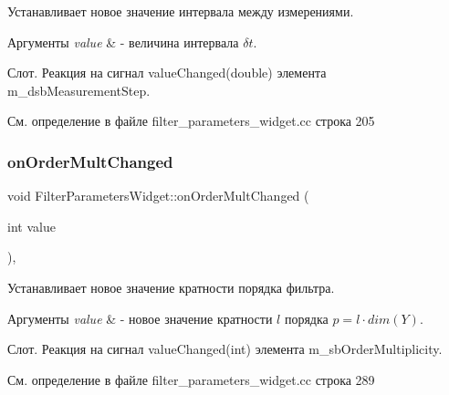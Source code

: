 Устанавливает новое значение интервала между измерениями. 


\begin{DoxyParams}{Аргументы}
{\em value} & -\/ величина интервала $\delta t$.\\
\hline
\end{DoxyParams}
Слот. Реакция на сигнал value\+Changed(double) элемента m\+\_\+dsb\+Measurement\+Step. 

См. определение в файле filter\+\_\+parameters\+\_\+widget.\+cc строка 205

\hypertarget{class_filter_parameters_widget_adacd531098565f7b21bd8d958a35fa74}{}\label{class_filter_parameters_widget_adacd531098565f7b21bd8d958a35fa74} 
\subsubsection{\texorpdfstring{on\+Order\+Mult\+Changed}{onOrderMultChanged}}
{\footnotesize\ttfamily void Filter\+Parameters\+Widget\+::on\+Order\+Mult\+Changed (\begin{DoxyParamCaption}\item[{int}]{value }\end{DoxyParamCaption})\hspace{0.3cm}{\ttfamily [private]}, {\ttfamily [slot]}}



Устанавливает новое значение кратности порядка фильтра. 


\begin{DoxyParams}{Аргументы}
{\em value} & -\/ новое значение кратности $l$ порядка $p = l\cdot dim(Y)$.\\
\hline
\end{DoxyParams}
Слот. Реакция на сигнал value\+Changed(int) элемента m\+\_\+sb\+Order\+Multiplicity. 

См. определение в файле filter\+\_\+parameters\+\_\+widget.\+cc строка 289

\hypertarget{class_filter_parameters_widget_a4c0b14d9be53fd4b45179037e09c33b3}{}\label{class_filter_parameters_widget_a4c0b14d9be53fd4b45179037e09c33b3} 
